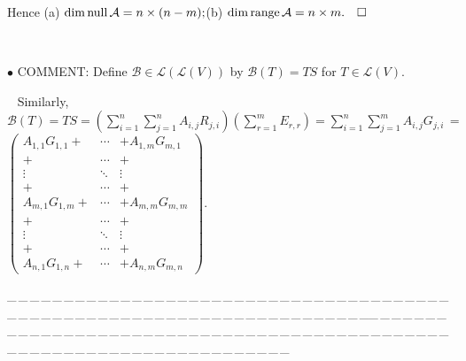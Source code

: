 \documentclass[a4paper, 11pt, UTF8]{article}
\def\range{\textup{range}\,}
\def\null{\textup{null\,}}
\def\Lm{\mathcal{L}}
\begin{document}
\begin{large}
Hence (a) $\dim\null \mathcal{A}=n\times(n-m);$\quad (b) $\dim\range \mathcal{A}=n\times m.\quad\square$\par{\tiny\,\par}
{\small $\bullet$} C{\small OMMENT:} Define $\mathcal{B}\in\Lm(\Lm(V))$ by $\mathcal{B}(T)=TS$ for $T\in\Lm(V)$.\par\,\,\,
Similarly, $\mathcal{B}(T)=TS=(\sum\limits_{i=1}^n\sum\limits_{j=1}^n A_{i,j}R_{j,i})(\sum\limits_{r=1}^m E_{r,r})=\sum\limits_{i=1}^n\sum\limits_{j=1}^m A_{i,j}G_{j,i}\,=\,${\tiny$\begin{pmatrix}
A_{1,1}G_{1,1}+&\cdots &+A_{1,m}G_{m,1}\\
+&\cdots &+\\
\vdots & \ddots & \vdots\\
+&\cdots &+\\
A_{m,1}G_{1,m}+&\cdots &+A_{m,m}G_{m,m}\\
+&\cdots &+\\
\vdots & \ddots & \vdots\\
+&\cdots & +\\
A_{n,1}G_{1,n}+&\cdots &+A_{n,m}G_{m,n}
\end{pmatrix}$}.\par
{\tiny \_\,\_\,\_\,\_\,\_\,\_\,\_\,\_\,\_\,\_\,\_\,\_\,\_\,\_\,\_\,\_\,\_\,\_\,\_\,\_\,\_\,\_\,\_\,\_\,\_\,\_\,\_\,\_\,\_\,\_\,\_\,\_\,\_\,\_\,\_\,\_\,\_\,\_\,\_\,\_\,\_\,\_\,\_\,\_\,\_\,\_\,\_\,\_\,\_\,\_\,\_\,\_\,\_\,\_\,\_\,\_\,\_\,\_\,\_\,\_\,\_\,\_\,\_\,\_\,\_\,\_\,\_\,\_\,\_\,\_\,\_\_\,\_\,\_\,\_\,\_\,\_\,\_\,\_\,\_\,\_\,\_\,\_\,\_\,\_\,\_\,\_\,\_\,\_\,\_\,\_\,\_\,\_\,\_\,\_\,\_\,\_\,\_\,\_\,\_\,\_\,\_\,\_\,\_\,\_\,\_\,\_\,\_\,\_\,\_\,\_\,\_\,\_\,\_\,\_\,\_\,\_\,\_\,\_\,\_\,\_\,\_\,\_\,\_\,\_\,\_\,\_\,\_\,\_\,\_\,\_\,\_\,\_\,\_\,\_\,\_\,\_\,\_\,\_\,\_\,\_\,\_}{\tiny\,\par}


\end{large}
\end{document}
